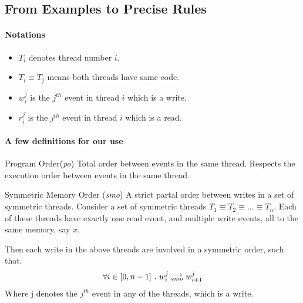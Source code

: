 \subsection{From Examples to Precise Rules}

    \paragraph{Notations}
        \begin{itemize}
            \item $T_i$ denotes thread number $i$.
            \item $T_i \equiv T_j$ means both threads have same code.
            \item $w_i^j$ is the $j^{th}$ event in thread $i$ which is a write.
            \item $r_i^j$ is the $j^{th}$ event in thread $i$ which is a read. 
        \end{itemize}

    
    \paragraph{A few definitions for our use}

    \begin{definition}{Program Order(\emph{po})}
        \label{ProgO}
        Total order between events in the same thread. Respects the execution order between events in the same thread. 
    \end{definition}

    \begin{definition}{Symmetric Memory Order (\emph{smo})}
        \label{SymMemO}
        A strict partal order between writes in a set of symmetric threads. Consider a set of symmetric threads $T_1 \equiv T_2 \equiv ... \equiv T_n$. Each of these threads have exactly one read event, and multiple write events, all to the same memory, say $x$. 

        Then each write in the above threads are involved in a symmetric order, such that. 
        \begin{align*}
            \forall i \in [0, n-1] \ . \ w_i^j\stackrel{\longrightarrow}{_{smo}}w_{i+1}^j
        \end{align*}
        Where j denotes the $j^{th}$ event in any of the threads, which is a write.
    \end{definition}


